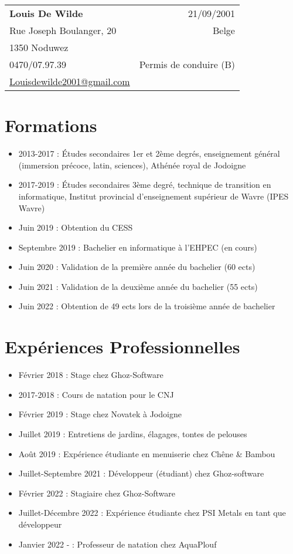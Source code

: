 \documentclass[a4paper,12pt]{article}
\begin{document}
    \noindent
    \begin{tabular*}{\textwidth}{@{\extracolsep{\fill}}lr}
        \textbf{Louis De Wilde} & 21/09/2001\\
        Rue Joseph Boulanger, 20 & Belge\\
        1350 Noduwez & \\
        0470/07.97.39 & Permis de conduire (B)\\
        \href{mailto:Louisdewilde2001@gmail.com}{Louisdewilde2001@gmail.com} & \\
    \end{tabular*}

    \section*{Formations}
    \begin{itemize}[noitemsep]
        \item 2013-2017 : Études secondaires 1er et 2ème degrés, enseignement général (immersion précoce, latin, sciences), Athénée royal de Jodoigne
        \item 2017-2019 : Études secondaires 3ème degré, technique de transition en informatique, Institut provincial d’enseignement supérieur de Wavre (IPES Wavre)
        \item Juin 2019 : Obtention du CESS
        \item Septembre 2019 : Bachelier en informatique à l'EHPEC (en cours)
        \item Juin 2020 : Validation de la première année du bachelier (60 ects)
        \item Juin 2021 : Validation de la deuxième année du bachelier (55 ects)
        \item Juin 2022 : Obtention de 49 ects lors de la troisième année de bachelier
    \end{itemize}

    \section*{Expériences Professionnelles}
    \begin{itemize}[noitemsep]
        \item Février 2018 : Stage chez Ghoz-Software
        \item 2017-2018 : Cours de natation pour le CNJ
        \item Février 2019 : Stage chez Novatek à Jodoigne
        \item Juillet 2019 : Entretiens de jardins, élagages, tontes de pelouses
        \item Août 2019 : Expérience étudiante en menuiserie chez Chêne \& Bambou
        \item Juillet-Septembre 2021 : Développeur (étudiant) chez Ghoz-software
        \item Février 2022 : Stagiaire chez Ghoz-Software
        \item Juillet-Décembre 2022 : Expérience étudiante chez PSI Metals en tant que développeur
        \item Janvier 2022 - : Professeur de natation chez AquaPlouf
    \end{itemize}
\end{document}
